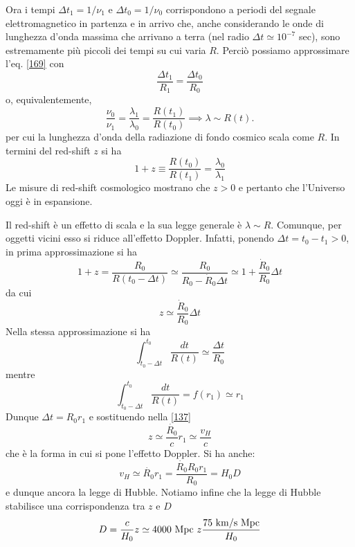 Ora i tempi $\Delta t_1= 1/\nu_1$ e $\Delta t_0 = 1/\nu_0$ corrispondono a
periodi del segnale elettromagnetico in partenza e in arrivo che, anche
considerando le onde di lunghezza d'onda massima che arrivano a terra (nel radio
$\Delta t \simeq 10^{-7}$ sec), sono estremamente più piccoli dei tempi su cui
varia $R$.  Perciò possiamo approssimare l'eq. \eqref{169} con
\begin{equation}
  \frac{\Delta t_1}{R_1} = \frac{\Delta t_0}{R_0}
\end{equation}
o, equivalentemente,
\begin{equation}
  \frac{\nu_0}{\nu_1} = \frac{\lambda_1}{\lambda_0}= \frac{R(t_1)}{R(t_0)}
  \implies \lambda \sim R(t).
\end{equation}
per cui la lunghezza d'onda della radiazione di fondo cosmico scala come $R$. In
termini del red-shift $z$ si ha
\begin{equation}
1+z \equiv \frac {R(t_0)} {R(t_1)} = \frac{\lambda_0} {\lambda_1}
\end{equation}
Le misure di red-shift cosmologico mostrano che $z>0$ e pertanto che l'Universo
oggi è in espansione.

Il red-shift è un effetto di scala e la sua legge generale è $\lambda \sim R$.
Comunque, per oggetti vicini esso si riduce all'effetto Doppler.  Infatti,
ponendo $\Delta t = t_0-t_1 >0 $, in prima approssimazione si ha
\begin{equation}
  1+z = \frac{R_0} {R(t_0-\Delta t)} \simeq \frac{R_0} {R_0 -\dot{R}_0 \Delta t}
  \simeq 1 + \frac {\dot{R}_0} {R_0} \Delta t
\end{equation}
da cui
\begin{equation}
  z \simeq \frac {\dot{R}_0} {R_0} \Delta t
  \label{137}
\end{equation}
Nella stessa approssimazione si ha
\begin{equation}
  \int_{t_0-\Delta t}^{t_0} \frac{dt}{R(t)} \simeq \frac{\Delta t}{R_0}
\end{equation}
mentre
\begin{equation}
  \int_{t_0-\Delta t}^{t_0} \frac{dt}{R(t)} = f(r_1) \simeq r_1
\end{equation}
Dunque $\Delta t =  R_0 r_1$ e sostituendo nella \eqref{137}
\begin{equation}
  z \simeq \frac{\dot{R_0}}{c} r_1 \simeq \frac {v_H}{c}
\end{equation}
che è la forma in cui si pone l'effetto Doppler.  Si ha anche:
\begin{equation}
  v_H \simeq {\dot{R_0}} r_1 = \frac {\dot{R_0} R_0  r_1} {R_0} = {H_0}{D}
\end{equation}
e dunque ancora la legge di Hubble.  Notiamo infine che la legge di Hubble
stabilisce una corrispondenza tra $z$ e $D$
\begin{equation}
  D = \frac{c}{H_0} z \simeq 4000~{\rm Mpc}~z \frac{75~{\rm km/s~Mpc}}{H_0}
\end{equation}

